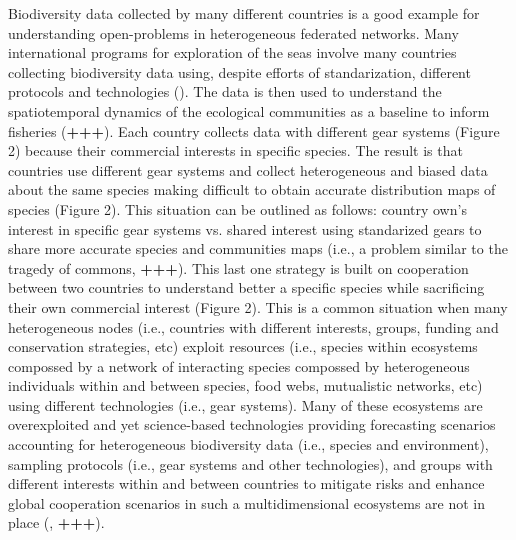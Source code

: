 \documentclass[11pt, a4paper]{article} %
\begin{document}
Biodiversity data collected by many different countries is a good
example for understanding open-problems in heterogeneous federated
networks. Many international programs for exploration of the seas
involve many countries collecting biodiversity data using, despite
efforts of standarization, different protocols and technologies
(\citep{ices}). The data is then used to understand the spatiotemporal
dynamics of the ecological communities as a baseline to inform
fisheries ({\bf +++}). Each country collects data with different gear
systems (Figure 2) because their commercial interests in specific
species. The result is that countries use different gear systems and
collect heterogeneous and biased data about the same species making
difficult to obtain accurate distribution maps of species (Figure
2). This situation can be outlined as follows: country own's interest
in specific gear systems vs. shared interest using standarized gears
to share more accurate species and communities maps (i.e., a problem
similar to the tragedy of commons, {\bf +++}). This last one strategy
is built on cooperation between two countries to understand better a
specific species while sacrificing their own commercial interest
(Figure 2). This is a common situation when many heterogeneous nodes
(i.e., countries with different interests, groups, funding and
conservation strategies, etc) exploit resources (i.e., species within
ecosystems compossed by a network of interacting species compossed by
heterogeneous individuals within and between species, food webs,
mutualistic networks, etc) using different technologies (i.e., gear
systems). Many of these ecosystems are overexploited and yet
science-based technologies providing forecasting scenarios accounting
for heterogeneous biodiversity data (i.e., species and environment),
sampling protocols (i.e., gear systems and other technologies),
and groups with different interests within and between countries to
mitigate risks and enhance global cooperation scenarios in such a
multidimensional ecosystems are not in place (\citep{Wilson2018}, {\bf
  +++}).
\end{document}
